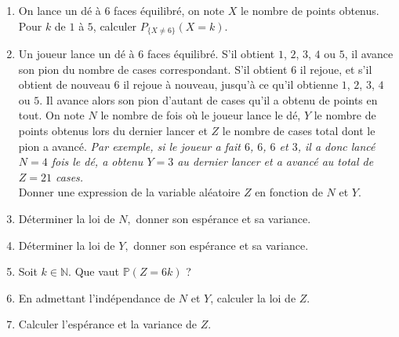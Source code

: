 \documentclass[a4paper,12pt,reqno]{amsart}
\begin{document}
\begin{exo} %
  \begin{enumerate}
    \item On lance un dé à 6 faces équilibré, on note $X$ le nombre de points obtenus. \\
      Pour $k$ de $1$ à $5$, calculer $P_{\{ X \neq 6 \}}(X=k)$.
    \item Un joueur lance un dé à 6 faces équilibré. S'il obtient $1$, $2$, $3$, $4$ ou $5$, il avance son pion du nombre de cases correspondant. S'il obtient $6$ il rejoue, et s'il obtient de nouveau $ 6 $ il rejoue à nouveau, jusqu'à ce qu'il obtienne $1$, $2$, $3$, $4$ ou $5$. Il avance alors son pion d'autant de cases qu'il a obtenu de points en tout. On note $N$ le nombre de fois où le joueur lance le dé, $Y$ le nombre de points obtenus lors du dernier lancer et $Z$ le nombre de cases total dont le pion a avancé. \emph{Par exemple, si le joueur a fait $6$, $6$, $6$ et $3$, il a donc lancé $N=4$ fois le dé, a obtenu $Y=3$ au dernier lancer et a avancé au total de $Z=21$ cases.}\\
    Donner une expression de la variable aléatoire $Z$ en fonction de $N$ et $Y$.
    \item Déterminer la loi de $N,$ donner son espérance et sa variance.
    \item Déterminer la loi de $Y,$ donner son espérance et sa variance.
    \item Soit $k \in \mathbb N$. Que vaut $\mathbb P(Z= 6k)$ ?
    \item En admettant l'indépendance de $N$ et $Y$, calculer la loi de $Z$.
    \item Calculer l'espérance et la variance de $Z$.
  \end{enumerate}
\end{exo}
\end{document}
